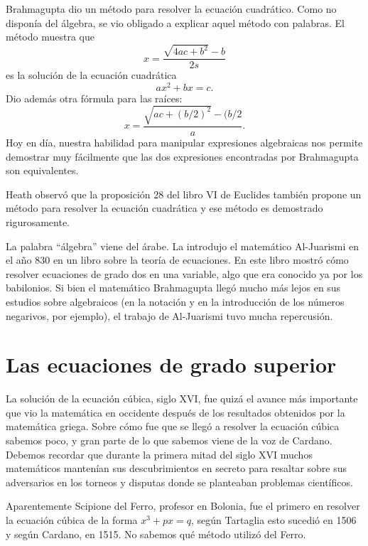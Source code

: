 Brahmagupta dio un método para resolver la ecuación cuadrático. Como no
disponía del álgebra, se vio obligado a explicar aquel método con palabras. El
método muestra que 
\[
x=\frac{\sqrt{4ac+b^2}-b}{2s}
\]
es la solución de la ecuación cuadrática 
\[
	ax^2+bx=c.
\]
Dio además otra fórmula para las raíces:
\[
	x=\frac{\sqrt{ac+(b/2)^2}-(b/2}{a}.
\]
Hoy en día, nuestra habilidad para manipular expresiones algebraicas nos
permite demostrar muy fácilmente que las dos expresiones encontradas por
Brahmagupta son equivalentes.

Heath observó que la proposición 28 del libro VI de Euclides también propone un
método para resolver la ecuación cuadrática y ese método es demostrado
rigurosamente.



La palabra ``álgebra'' viene del árabe. La introdujo el matemático Al-Juarismi
en el año 830 en un libro sobre la teoría de ecuaciones.  En este libro mostró
cómo resolver ecuaciones de grado dos en una variable, algo que era conocido ya
por los babilonios.  Si bien el matemático Brahmagupta llegó mucho más lejos en
sus estudios sobre algebraicos (en la notación y en la introducción de los
números negarivos, por ejemplo), el trabajo de Al-Juarismi tuvo mucha
repercusión. 

\section*{Las ecuaciones de grado superior}

La solución de la ecuación cúbica, siglo XVI, fue quizá el avance más
importante que vio la matemática en occidente después de los resultados
obtenidos por la matemática griega. Sobre cómo fue que se llegó a resolver la
ecuación cúbica sabemos poco, y gran parte de lo que sabemos viene de la voz de
Cardano. Debemos recordar que durante la primera mitad del siglo XVI muchos matemáticos
mantenían sus descubrimientos en secreto para resaltar sobre sus adversarios en
los torneos y disputas donde se planteaban problemas científicos.

Aparentemente Scipione del Ferro, profesor en Bolonia, fue el primero en
resolver la ecuación cúbica de la forma $x^3+px=q$, según Tartaglia esto
sucedió en 1506 y según Cardano, en 1515. No sabemos qué método utilizó del
Ferro. 

